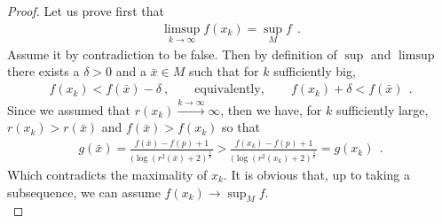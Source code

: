 \documentclass[a4paper,11pt,openright,twoside]{book}
\newcommand{\1}{\mathds{1}}
\theoremstyle{plain}
\theoremstyle{definition}
\theoremstyle{remark}
\begin{document}
\begin{proof}
	Let us prove first that
	\begin{align}\label{eq:boundprin13}
		\limsup_{k\to \infty}f(x_k) = \sup_M f
	\ \ .
	\end{align}
	Assume it by contradiction to be false. Then by definition of $\sup$ and $\limsup$ there exists a $\delta > 0$ and a $ \bar{x}\in M$ such that for $k$ sufficiently big,
	\begin{align}\label{eq:boundprin12}
		f(x_k)< f(\bar x)-\delta\ , \qquad \text{equivalently},\qquad f(x_k)+\delta < f(\bar x)
	\ \ .
	\end{align}
	Since we assumed that $r(x_k) \overset{k\to \infty}{\longrightarrow} \infty$, then we have, for $k$ sufficiently large, $r(x_k) > r(\bar x) $ and $f(\bar x) > f(x_k)$ so that
	\begin{align*}
		g(\bar x) = \frac{f(\bar x)-f(p)+1}{(\log(r^2(\bar x) +2)^{\frac{1}{k}}} > \frac{f(x_k )-f(p)+1}{(\log(r^2(x_k) +2)^{\frac{1}{k}}} = g(x_k) 
	\ \ .
	\end{align*}
	Which contradicts the maximality of $x_k$.
	It is obvious that, up to taking a subsequence, we can assume $f(x_k) \to  \sup_M f$.\\


\end{proof}
\end{document}
